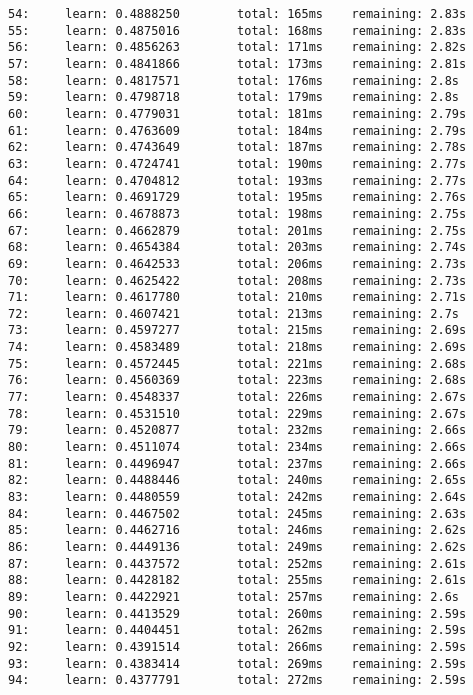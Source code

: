 \documentclass[11pt]{article}
\begin{document}
\begin{Verbatim}[commandchars=\\\{\}]
54:     learn: 0.4888250        total: 165ms    remaining: 2.83s
55:     learn: 0.4875016        total: 168ms    remaining: 2.83s
56:     learn: 0.4856263        total: 171ms    remaining: 2.82s
57:     learn: 0.4841866        total: 173ms    remaining: 2.81s
58:     learn: 0.4817571        total: 176ms    remaining: 2.8s
59:     learn: 0.4798718        total: 179ms    remaining: 2.8s
60:     learn: 0.4779031        total: 181ms    remaining: 2.79s
61:     learn: 0.4763609        total: 184ms    remaining: 2.79s
62:     learn: 0.4743649        total: 187ms    remaining: 2.78s
63:     learn: 0.4724741        total: 190ms    remaining: 2.77s
64:     learn: 0.4704812        total: 193ms    remaining: 2.77s
65:     learn: 0.4691729        total: 195ms    remaining: 2.76s
66:     learn: 0.4678873        total: 198ms    remaining: 2.75s
67:     learn: 0.4662879        total: 201ms    remaining: 2.75s
68:     learn: 0.4654384        total: 203ms    remaining: 2.74s
69:     learn: 0.4642533        total: 206ms    remaining: 2.73s
70:     learn: 0.4625422        total: 208ms    remaining: 2.73s
71:     learn: 0.4617780        total: 210ms    remaining: 2.71s
72:     learn: 0.4607421        total: 213ms    remaining: 2.7s
73:     learn: 0.4597277        total: 215ms    remaining: 2.69s
74:     learn: 0.4583489        total: 218ms    remaining: 2.69s
75:     learn: 0.4572445        total: 221ms    remaining: 2.68s
76:     learn: 0.4560369        total: 223ms    remaining: 2.68s
77:     learn: 0.4548337        total: 226ms    remaining: 2.67s
78:     learn: 0.4531510        total: 229ms    remaining: 2.67s
79:     learn: 0.4520877        total: 232ms    remaining: 2.66s
80:     learn: 0.4511074        total: 234ms    remaining: 2.66s
81:     learn: 0.4496947        total: 237ms    remaining: 2.66s
82:     learn: 0.4488446        total: 240ms    remaining: 2.65s
83:     learn: 0.4480559        total: 242ms    remaining: 2.64s
84:     learn: 0.4467502        total: 245ms    remaining: 2.63s
85:     learn: 0.4462716        total: 246ms    remaining: 2.62s
86:     learn: 0.4449136        total: 249ms    remaining: 2.62s
87:     learn: 0.4437572        total: 252ms    remaining: 2.61s
88:     learn: 0.4428182        total: 255ms    remaining: 2.61s
89:     learn: 0.4422921        total: 257ms    remaining: 2.6s
90:     learn: 0.4413529        total: 260ms    remaining: 2.59s
91:     learn: 0.4404451        total: 262ms    remaining: 2.59s
92:     learn: 0.4391514        total: 266ms    remaining: 2.59s
93:     learn: 0.4383414        total: 269ms    remaining: 2.59s
94:     learn: 0.4377791        total: 272ms    remaining: 2.59s

\end{Verbatim}
\end{document}

